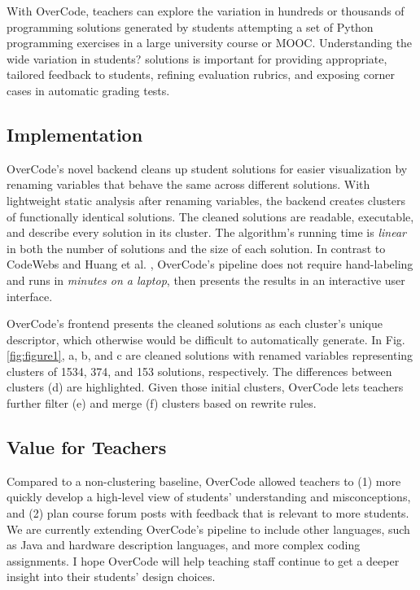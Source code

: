 \documentclass{sigchi}
\begin{document}
With OverCode, teachers can explore the variation in hundreds or thousands of programming solutions generated by students attempting a set of Python programming exercises in a large university course or MOOC. Understanding the wide variation in students? solutions is important for providing appropriate, tailored feedback to students, refining evaluation rubrics, and exposing corner cases in automatic grading tests.

\subsection{Implementation}
OverCode's novel backend cleans up student solutions for easier visualization by renaming variables that behave the same across different solutions. With lightweight static analysis after renaming variables, the backend creates clusters of functionally identical solutions. The cleaned solutions are readable, executable, and describe every solution in its cluster. The algorithm's running time is \emph{linear} in both the number of solutions and the size of each solution. In contrast to CodeWebs \cite{codewebs} and Huang et al. \citeyear{MOOCshop}, OverCode's pipeline does not require hand-labeling and runs in \emph{minutes on a laptop}, then presents the results in an interactive user interface.

OverCode's frontend presents the cleaned solutions as each cluster's unique descriptor, which otherwise would be difficult to automatically generate. In Fig. \ref{fig:figure1}, a, b, and c are cleaned solutions with renamed variables representing clusters of 1534, 374, and 153 solutions, respectively. The differences between clusters (d) are highlighted. Given those initial clusters, OverCode lets teachers further filter (e) and merge (f) clusters based on rewrite rules.

\subsection{Value for Teachers}
Compared to a non-clustering baseline, OverCode allowed teachers to (1) more quickly develop a high-level view of students' understanding and misconceptions, and (2) plan course forum posts with feedback that is relevant to more students. We are currently extending OverCode's pipeline to include other languages, such as Java and hardware description languages, and more complex coding assignments. I hope OverCode will help teaching staff continue to get a deeper insight into their students' design choices.
\end{document}
